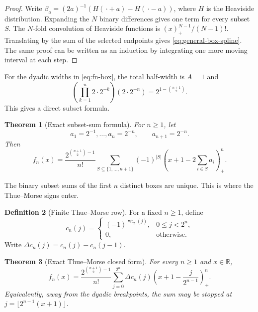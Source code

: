 \documentclass[11pt,oneside]{article}
\newtheorem{theorem}{Theorem}[section]
\theoremstyle{definition}
\newtheorem{definition}[theorem]{Definition}
\theoremstyle{remark}
\newcommand{\R}{\mathbb R}
\newcommand{\wt}{\operatorname{wt}_2}
\newcommand{\pos}[1]{\left(#1\right)_{+}}
\begin{document}
\begin{proof}
Write
$\beta_a=(2a)^{-1}(H(\,\boldsymbol\cdot+a)-H(\,\boldsymbol\cdot-a))$, where $H$ is the
Heaviside distribution.  Expanding the $N$ binary differences gives one term for every
subset $S$.  The $N$-fold convolution of Heaviside functions is
$\pos x^{N-1}/(N-1)!$.  Translating by the sum of the selected endpoints gives
\eqref{eq:general-box-spline}.  The same proof can be written as an induction by integrating
one more moving interval at each step.
\end{proof}

For the dyadic widths in \eqref{eq:fn-box}, the total half-width is $A=1$ and
\begin{equation}
 \left(\prod_{k=1}^{n}2\cdot2^{-k}\right)(2\cdot2^{-n})
 =2^{1-\binom{n+1}{2}}.                                    \label{eq:normalization-product}
\end{equation}
This gives a direct subset formula.

\begin{theorem}[Exact subset-sum formula]
\label{thm:subset-formula}
For $n\ge1$, let
\[
 a_1=2^{-1},\ldots,a_n=2^{-n},\qquad a_{n+1}=2^{-n}.
\]
Then
\begin{equation}
 f_n(x)=\frac{2^{\binom{n+1}{2}-1}}{n!}
 \sum_{S\subseteq\{1,\ldots,n+1\}}(-1)^{|S|}
 \pos{x+1-2\sum_{i\in S}a_i}^{n}.                         \label{eq:subset-formula}
\end{equation}
\end{theorem}

The binary subset sums of the first $n$ distinct boxes are unique.  This is where the
Thue--Morse signs enter.

\begin{definition}[Finite Thue--Morse row]
For a fixed $n\ge1$, define
\begin{equation}
 c_n(j)=
 \begin{cases}
  (-1)^{\wt(j)},&0\le j<2^n,\\
  0,&\text{otherwise}.
 \end{cases}                                                \label{eq:cn}
\end{equation}
Write $\Delta c_n(j)=c_n(j)-c_n(j-1)$.
\end{definition}

\begin{theorem}[Exact Thue--Morse closed form]
\label{thm:TM-formula}
For every $n\ge1$ and $x\in\R$,
\begin{equation}
 \boxed{\displaystyle
 f_n(x)=\frac{2^{\binom{n+1}{2}-1}}{n!}
 \sum_{j=0}^{2^n}\Delta c_n(j)
 \pos{x+1-\frac{j}{2^{n-1}}}^{n}.}                         \label{eq:TM-formula}
\end{equation}
Equivalently, away from the dyadic breakpoints, the sum may be stopped at
$j=\lfloor2^{n-1}(x+1)\rfloor$.
\end{theorem}
\end{document}
